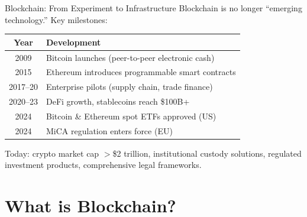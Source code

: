 \documentclass[10pt]{beamer}
\newcommand{\good}[1]{\textcolor{AccentGreen}{#1}}
\begin{document}
\begin{frame}{Blockchain: From Experiment to Infrastructure}
  Blockchain is no longer ``emerging technology.'' Key milestones:
  
  \vspace{0.5em}
  \begin{center}
  \begin{tabular}{cl}
    \toprule
    \textbf{Year} & \textbf{Development} \\
    \midrule
    2009 & Bitcoin launches (peer-to-peer electronic cash) \\
    2015 & Ethereum introduces programmable smart contracts \\
    2017--20 & Enterprise pilots (supply chain, trade finance) \\
    2020--23 & DeFi growth, stablecoins reach \$100B+ \\
    2024 & \good{Bitcoin \& Ethereum spot ETFs approved (US)} \\
    2024 & \good{MiCA regulation enters force (EU)} \\
    \bottomrule
  \end{tabular}
  \end{center}
  
  \vspace{1em}
  Today: crypto market cap $>$\$2 trillion, institutional custody solutions, regulated investment products, comprehensive legal frameworks.
\end{frame}

\section{What is Blockchain?}
\end{document}
